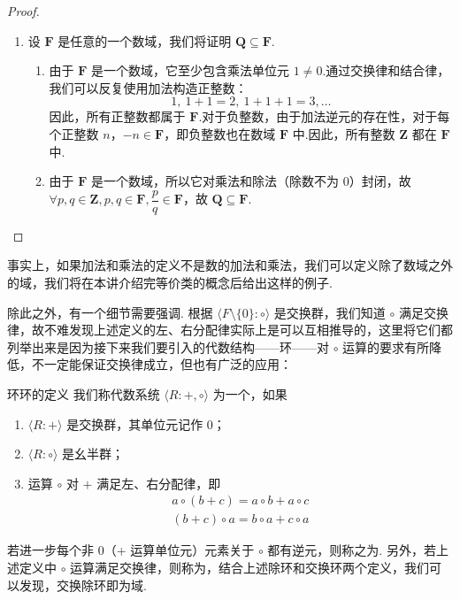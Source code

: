 \begin{proof}
\begin{enumerate}
    \item 设 $\mathbf{F}$ 是任意的一个数域，我们将证明 $\mathbf{Q} \subseteq \mathbf{F}$.
    \begin{enumerate}
        \item 由于 $\mathbf{F}$ 是一个数域，它至少包含乘法单位元 $1 \neq 0$.通过交换律和结合律，我们可以反复使用加法构造正整数：
        \[
        1, \ 1 + 1 = 2, \ 1 + 1 + 1 = 3, \dots
        \]
        因此，所有正整数都属于 $\mathbf{F}$.对于负整数，由于加法逆元的存在性，对于每个正整数 $n$，$-n \in \mathbf{F}$，即负整数也在数域 $\mathbf{F}$ 中.因此，所有整数 $\mathbf{Z}$ 都在 $\mathbf{F}$ 中.
        \item 由于 $\mathbf{F}$ 是一个数域，所以它对乘法和除法（除数不为 $0$）封闭，故 $\forall p,q \in \mathbf{Z}, p,q \in \mathbf{F}, \dfrac{p}{q} \in \mathbf{F}$，故 $\mathbf{Q} \subseteq \mathbf{F}$.
    \end{enumerate}
\end{enumerate}
\end{proof}

事实上，如果加法和乘法的定义不是数的加法和乘法，我们可以定义除了数域之外的域，我们将在本讲介绍完等价类的概念后给出这样的例子.

除此之外，有一个细节需要强调. 根据 $\langle F\setminus\{0\}\colon\circ\rangle$ 是交换群，我们知道 $\circ$ 满足交换律，故不难发现上述定义的左、右分配律实际上是可以互相推导的，这里将它们都列举出来是因为接下来我们要引入的代数结构——环——对 $\circ$ 运算的要求有所降低，不一定能保证交换律成立，但也有广泛的应用：

\begin{definition}{环}{环的定义} 
    我们称代数系统 $\langle R\colon+,\circ\rangle$ 为一个，如果
    \begin{enumerate}
        \item $\langle R\colon+\rangle$ 是交换群，其单位元记作 $0$；

        \item $\langle R\colon\circ\rangle$ 是幺半群；

        \item 运算 $\circ$ 对 $+$ 满足左、右分配律，即
              \begin{gather*}
                  a \circ (b + c) = a \circ b + a \circ c \\
                  (b + c) \circ a = b \circ a + c \circ a
              \end{gather*}
    \end{enumerate}

    若进一步每个非 $0$（$+$ 运算单位元）元素关于 $\circ$ 都有逆元，则称之为. 另外，若上述定义中 $\circ$ 运算满足交换律，则称为，结合上述除环和交换环两个定义，我们可以发现，交换除环即为域.
\end{definition}

